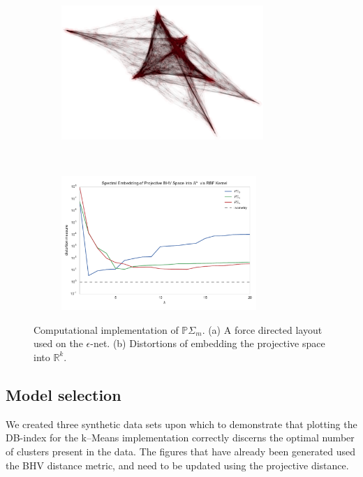 \documentclass[a4paper,11pt]{article}
\begin{document}
\begin{figure}
    \begin{subfigure}{0.5\linewidth}
    \centering
    \includegraphics[height=2in]{../figures/synthetic_graph_layout.png}
    \end{subfigure}
    ~
    \begin{subfigure}{0.5\linewidth}
    \centering
    \includegraphics[height=2in]{../figures/synthetic_distortion.pdf}
    \end{subfigure}

    \caption{Computational implementation of $\mathbb{P}\Sigma_m$. (a) A force directed layout used on the $\epsilon$-net. (b) Distortions of embedding the projective space into $\mathbb{R}^k$.}
     \label{fig:epsilon_net}
\end{figure}

\subsection{Model selection}

We created three synthetic data sets upon which to demonstrate that plotting the DB-index for the k--Means implementation correctly discerns the optimal number of clusters present in the data.
The figures that have already been generated used the BHV distance metric, and need to be updated using the projective distance.
\end{document}
